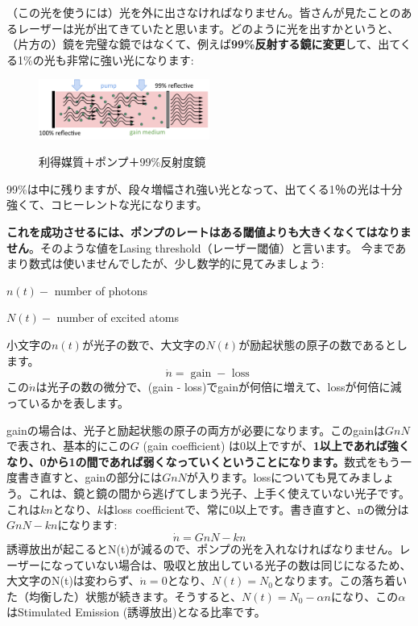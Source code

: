 （この光を使うには）光を外に出さなければなりません。皆さんが見たことのあるレーザーは光が出てきていたと思います。どのように光を出すかというと、
（片方の）鏡を完璧な鏡ではなくて、例えば\textbf{99\%反射する鏡に変更}して、出てくる1\%の光も非常に強い光になります:
\begin{figure}[H]
    \centering
    \includegraphics[width=0.5\textwidth]{lesson5/medium_99_mirror.pdf}
    \label{図: 1}
    \caption{利得媒質＋ポンプ＋99\%反射度鏡}
\end{figure}

99\%は中に残りますが、段々増幅され強い光となって、出てくる1％の光は十分強くて、コヒーレントな光になります。

\textbf{これを成功させるには、ポンプのレートはある閾値よりも大きくなくてはなりません}。そのような値をLasing threshold（レーザー閾値）と言います。
今まであまり数式は使いませんでしたが、少し数学的に見てみましょう:

$n(t)-$ number of photons

$N(t)-$ number of excited atoms

小文字の$n(t)$が光子の数で、大文字の$N(t)$が励起状態の原子の数であるとします。
\begin{equation}
\dot{n}=\operatorname{gain}-\text { loss }
\end{equation}
この$\Dot{n}$は光子の数の微分で、(gain - loss)でgainが何倍に増えて、lossが何倍に減っているかを表します。

gainの場合は、光子と励起状態の原子の両方が必要になります。このgainは$GnN$で表され、基本的にこの$G$ (gain coefficient) は0以上ですが、\textbf{1以上であれば強くなり、0から1の間であれば弱くなっていくということになります。}数式をもう一度書き直すと、gainの部分には$GnN$が入ります。lossについても見てみましょう。これは、鏡と鏡の間から逃げてしまう光子、上手く使えていない光子です。これは$kn$となり、$k$はloss coefficientで、常に0以上です。書き直すと、nの微分は$GnN - kn$になります:
\begin{equation}
\dot{n}=G n N-k n
\end{equation}
誘導放出が起こるとN(t)が減るので、ポンプの光を入れなければなりません。レーザーになっていない場合は、吸収と放出している光子の数は同じになるため、
大文字のN(t)は変わらず、$\Dot{n}=0$となり、$N(t) = N_0$となります。この落ち着いた（均衡した）状態が続きます。そうすると、$N(t)=N_0 - \alpha n$になり、この$\alpha$はStimulated Emission (誘導放出)となる比率です。

